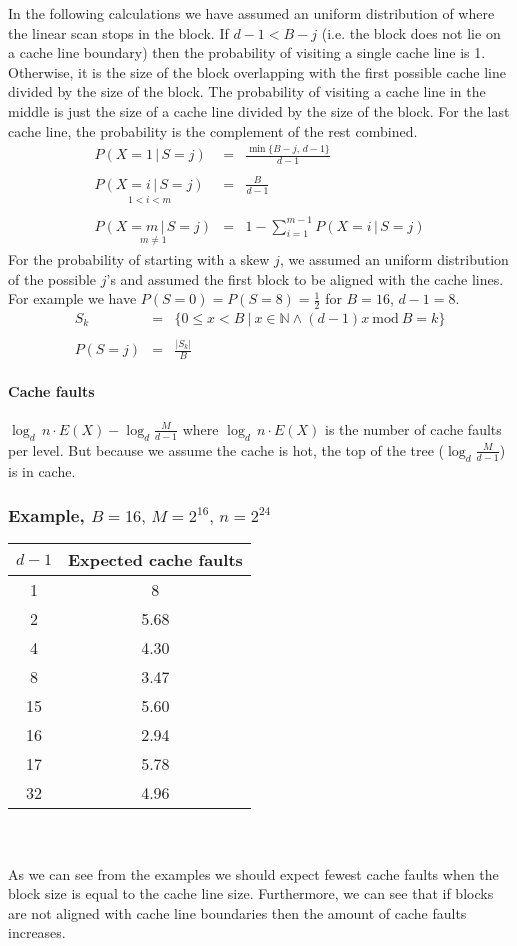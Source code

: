 In the following calculations we have assumed an uniform distribution of where the linear scan stops in the block. If $d - 1 < B - j$ (i.e. the block does not lie on a cache line boundary) then the probability of visiting a single cache line is 1. Otherwise, it is the size of the block overlapping with the first possible cache line divided by the size of the block. The probability of visiting a cache line in the middle is just the size of a cache line divided by the size of the block. For the last cache line, the probability is the complement of the rest combined.
\begin{eqnarray*}
P(X=1\,|\, S=j) & = & \frac{\min\{B-j,\, d-1\}}{d-1}\\
\\
\underset{1 < i < m}{P(X=i\,|\, S=j)} & = & \frac{B}{d-1}\\
\\
\underset{m\neq1}{P(X=m\,|\, S=j)} & = & 1-\sum_{i=1}^{m-1}P(X=i\,|\, S=j)
\end{eqnarray*}
For the probability of starting with a skew $j$, we assumed an uniform distribution of the possible $j$'s and assumed the first block to be aligned with the cache lines. For example we have $P(S = 0) = P(S = 8) = \frac{1}{2}$ for $B = 16$, $d - 1 = 8$.
\begin{eqnarray*}
S_k & = & \{ 0 \leq x < B\ |\ x \in \mathbb{N} \wedge (d - 1)x\ \textrm{mod}\ B = k \}\\
\\
P(S=j) & = & \frac{|S_k|}{B}
\end{eqnarray*}

\paragraph*{Cache faults}

$\log_{d}\, n\cdot E(X)-\log_{d}\frac{M}{d-1}$
where $\log_{d}\, n\cdot E(X)$ is the number of cache faults per level. But because we assume the cache is hot, the top of the tree ($\log_{d}\frac{M}{d-1}$) is in cache.


\subsubsection*{Example, $B=16,\, M=2^{16},\, n=2^{24}$}

\begin{tabular}{|c|c|}
\hline 
$d - 1$ & Expected cache faults\tabularnewline
\hline 
\hline 
1 & 8\tabularnewline
\hline 
2 & 5.68\tabularnewline
\hline 
4 & 4.30\tabularnewline
\hline 
8 & 3.47\tabularnewline
\hline 
15 & 5.60\tabularnewline
\hline 
16 & 2.94\tabularnewline
\hline 
17 & 5.78\tabularnewline
\hline 
32 & 4.96\tabularnewline
\hline 
\end{tabular}
\\
\\
As we can see from the examples we should expect fewest cache faults when the block size is equal to the cache line size. Furthermore, we can see that if blocks are not aligned with cache line boundaries then the amount of cache faults increases.

